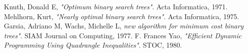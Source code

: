 \begin{thebibliography}{9} 
	 Knuth, Donald E, \emph{"Optimum binary search trees"}. Acta Informatica, 1971.
	 Mehlhorn, Kurt, \emph{"Nearly optimal binary search trees"}. Acta Informatica, 1975.
	 Garsia, Adriano M, Wachs, Michelle L, \emph{ new algorithm for minimum cost binary trees"}. SIAM Journal on Computing, 1977.
	 F. Frances Yao, \emph{"Efficient Dynamic Programming Using Quadrangle Inequalities"}. STOC, 1980.
\end{thebibliography}
